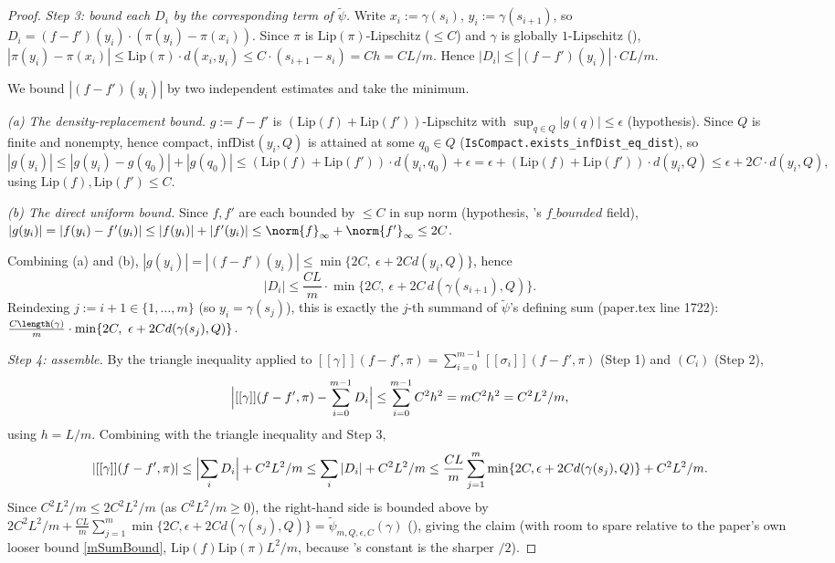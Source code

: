 \begin{proof}
  \emph{Step 3: bound each $D_i$ by the corresponding term of $\tilde\psi$.} Write
  $x_i:=\gamma(s_i)$, $y_i:=\gamma(s_{i+1})$, so $D_i=(f-f')(y_i)\cdot(\pi(y_i)-\pi(x_i))$. Since
  $\pi$ is $\mathrm{Lip}(\pi)$-Lipschitz ($\le C$) and $\gamma$ is globally $1$-Lipschitz
  (), $|\pi(y_i)-\pi(x_i)| \le \mathrm{Lip}(\pi)\cdot d(x_i,y_i) \le
  C\cdot(s_{i+1}-s_i) = C h = CL/m$. Hence $|D_i| \le |(f-f')(y_i)| \cdot CL/m$.

  We bound $|(f-f')(y_i)|$ by two independent estimates and take the minimum.

  \emph{(a) The density-replacement bound.} $g:=f-f'$ is $(\mathrm{Lip}(f)+\mathrm{Lip}(f'))$-Lipschitz
  with $\sup_{q\in Q}|g(q)|\le\epsilon$ (hypothesis). Since $Q$ is finite and nonempty, hence
  compact, $\mathrm{infDist}(y_i,Q)$ is attained at some $q_0 \in Q$
  (\texttt{IsCompact.exists\_infDist\_eq\_dist}), so
  \[
    |g(y_i)| \le |g(y_i)-g(q_0)| + |g(q_0)| \le (\mathrm{Lip}(f)+\mathrm{Lip}(f'))\cdot d(y_i,q_0)
      +\epsilon = \epsilon + (\mathrm{Lip}(f)+\mathrm{Lip}(f'))\cdot d(y_i,Q) \le \epsilon + 2C\cdot
      d(y_i,Q)
    ,
  \]
  using $\mathrm{Lip}(f),\mathrm{Lip}(f')\le C$.

  \emph{(b) The direct uniform bound.} Since $f,f'$ are each bounded by $\le C$ in sup norm
  (hypothesis, 's $f\_bounded$ field), $|g(y_i)|=|f(y_i)-f'(y_i)| \le
  |f(y_i)|+|f'(y_i)| \le \norm{f}_\infty + \norm{f'}_\infty \le 2C$.

  Combining (a) and (b), $|g(y_i)| = |(f-f')(y_i)| \le \min\{2C,\ \epsilon+2Cd(y_i,Q)\}$, hence
  \[
    |D_i| \le \frac{CL}{m}\cdot\min\{2C,\ \epsilon+2C\,d(\gamma(s_{i+1}),Q)\}
    .
  \]
  Reindexing $j:=i+1\in\{1,\dots,m\}$ (so $y_i=\gamma(s_j)$), this is exactly the $j$-th summand of
  $\tilde\psi$'s defining sum (paper.tex line 1722):
  $\frac{C\length(\gamma)}{m}\cdot\min\{2C,\ \epsilon+2Cd(\gamma(s_j),Q)\}$.

  \emph{Step 4: assemble.} By the triangle inequality applied to
  $[[\gamma]](f-f',\pi)=\sum_{i=0}^{m-1}[[\sigma_i]](f-f',\pi)$ (Step 1) and $(C_i)$ (Step 2),
  \[
    \Bigl|[[\gamma]](f-f',\pi) - \sum_{i=0}^{m-1}D_i\Bigr| \le \sum_{i=0}^{m-1}C^2h^2 = mC^2h^2
      = C^2L^2/m
    ,
  \]
  using $h=L/m$. Combining with the triangle inequality and Step 3,
  \[
    |[[\gamma]](f-f',\pi)| \le \Bigl|\sum_iD_i\Bigr|+C^2L^2/m \le \sum_i|D_i|+C^2L^2/m
      \le \frac{CL}{m}\sum_{j=1}^m\min\{2C,\epsilon+2Cd(\gamma(s_j),Q)\}+C^2L^2/m
    .
  \]
  Since $C^2L^2/m \le 2C^2L^2/m$ (as $C^2L^2/m\ge0$), the right-hand side is bounded above by
  $2C^2L^2/m + \frac{CL}{m}\sum_{j=1}^m\min\{2C,\epsilon+2Cd(\gamma(s_j),Q)\} =
  \tilde\psi_{m,Q,\epsilon,C}(\gamma)$ (), giving the claim (with room to spare
  relative to the paper's own looser bound \eqref{mSumBound}, $\mathrm{Lip}(f)\mathrm{Lip}(\pi)L^2/m$,
  because 's constant is the sharper $/2$).
\end{proof}
